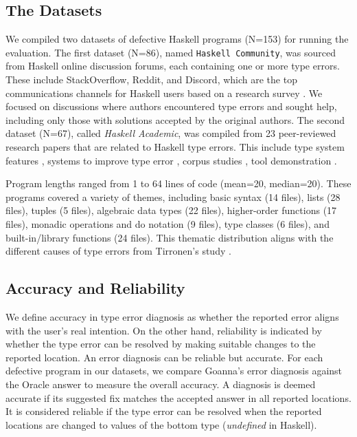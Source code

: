 \documentclass[pdflatex,lineno,sn-nature,Numbered]{sn-jnl}%
\begin{document}
\subsection{The Datasets} \label{sub:dataset}

We compiled two datasets of defective Haskell programs (N=153) for running the evaluation. The first dataset (N=86), named \texttt{Haskell Community}, was sourced from Haskell online discussion forums, each containing one or more type errors. These include StackOverflow, Reddit, and Discord, which are the top communications channels for Haskell users based on a research survey \cite{Fausak2022-zf}. We focused on discussions where authors encountered type errors and sought help, including only those with solutions accepted by the original authors. The second dataset (N=67), called \textit{Haskell Academic}, was compiled from 23 peer-reviewed research papers that are related to Haskell type errors. This include type system features \cite{Chargueraud2015-km,Haack2004-fr,Bhanuka2023-qv,Lee1998-fx}, systems to improve type error \cite{Zhang2015-xy,Zhang2017-tj,Chen2014-dz,Chen2020-ad,Chen2022-xb,Seidel2017-uf,Tsushima2021-es,Wu2017-ws,Fu2023-fm,Stuckey2003-pz,Chen2017-fc,Stuckey2004-fb,Lerner2007-yq,Pavlinovic2014-rw}, corpus studies \cite{Wu2017-eb,Tirronen2015-nr,Nemeth2019-pv}, tool demonstration \cite{Heeren2003-kd,Stuckey2003-lo}.

Program lengths ranged from 1 to 64 lines of code (mean=20, median=20). These programs covered a variety of themes, including basic syntax (14 files), lists (28 files), tuples (5 files), algebraic data types (22 files), higher-order functions (17 files), monadic operations and do notation (9 files), type classes (6 files), and built-in/library functions (24 files). This thematic distribution aligns with the different causes of type errors from Tirronen's study \cite{Tirronen2015-nr}.

\subsection{Accuracy and Reliability} \label{sub:eval-accuracy}

We define accuracy in type error diagnosis as whether the reported error aligns with the user's real intention. On the other hand, reliability is indicated by whether the type error can be resolved by making suitable changes to the reported location. An error diagnosis can be reliable but accurate. For each defective program in our datasets, we compare Goanna's error diagnosis against the Oracle answer to measure the overall accuracy. A diagnosis is deemed accurate if its suggested fix matches the accepted answer in all reported locations. It is considered reliable if the type error can be resolved when the reported locations are changed to values of the bottom type (\textit{undefined} in Haskell).
\end{document}
